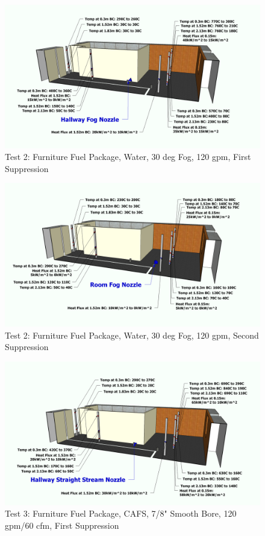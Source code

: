 \documentclass[12pt,oneside]{book}
\begin{document}
\begin{figure}[!ht]
	\includegraphics[width=6in]{../Figures/Pictures/Metric/DelCoFogTest2FirstSuppression}
	\caption{Test 2: Furniture Fuel Package, Water, 30 deg Fog, 120 gpm, First Suppression}
	\label{fig:Test_2_First_Suppression}
\end{figure}

\begin{figure}[!ht]
	\includegraphics[width=6in]{../Figures/Pictures/Metric/DelCoFogTest2SecondSuppression}
	\caption{Test 2: Furniture Fuel Package, Water, 30 deg Fog, 120 gpm, Second Suppression}
	\label{fig:Test_2_Second_Suppression}
\end{figure}

\begin{figure}[!ht]
	\includegraphics[width=6in]{../Figures/Pictures/Metric/DelCoSSTest3FirstSuppression}
	\caption{Test 3: Furniture Fuel Package, CAFS, 7/8" Smooth Bore, 120 gpm/60 cfm, First Suppression}
	\label{fig:Test_3_First_Suppression}
\end{figure}
\end{document}
